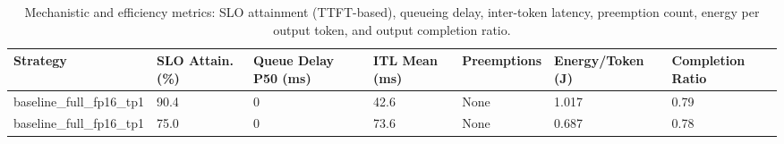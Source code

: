 \begin{table}
\caption{Mechanistic and efficiency metrics: SLO attainment (TTFT-based), queueing delay, inter-token latency, preemption count, energy per output token, and output completion ratio.}
\label{tab:efficiency}
\begin{tabular}{lllllll}
\toprule
Strategy & SLO Attain. (\%) & Queue Delay P50 (ms) & ITL Mean (ms) & Preemptions & Energy/Token (J) & Completion Ratio \\
\midrule
baseline\_full\_fp16\_tp1 & 90.4 & 0 & 42.6 & None & 1.017 & 0.79 \\
baseline\_full\_fp16\_tp1 & 75.0 & 0 & 73.6 & None & 0.687 & 0.78 \\
\bottomrule
\end{tabular}
\end{table}
